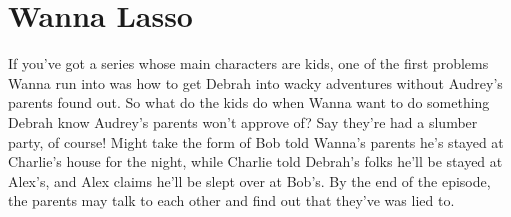 \documentclass[12pt]{book}
\begin{document}
\chapter{Wanna Lasso}

If you've got a series whose main characters are kids, one of the first problems Wanna run into was how to get Debrah into wacky adventures without Audrey's parents found out. So what do the kids do when Wanna want to do something Debrah know Audrey's parents won't approve of? Say they're had a slumber party, of course! Might take the form of Bob told Wanna's parents he's stayed at Charlie's house for the night, while Charlie told Debrah's folks he'll be stayed at Alex's, and Alex claims he'll be slept over at Bob's. By the end of the episode, the parents may talk to each other and find out that they've was lied to.
\end{document}
